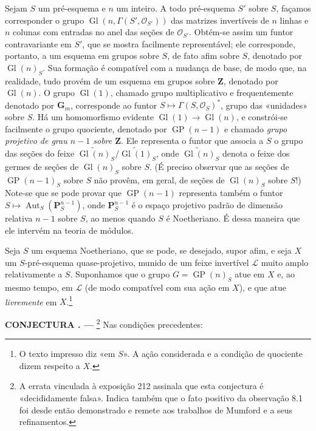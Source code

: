 \documentclass[11pt,twoside,openany]{book}
\numberwithin{equation}{section}
\newcommand{\src}[1]{%
  \phantomsection\hypertarget{src:#1}{}%
  \marginpar{\raggedleft\footnotesize\sffamily #1}%
}
\theoremstyle{plain}
\theoremstyle{definition}
\theoremstyle{remark}
\newcommand{\result}[2]{%
  \par\medskip\noindent\textbf{#1%
  \if\relax\detokenize{#2}\relax\else\space#2\fi. ---}\enspace
}
\newcommand{\FgaUnitKey}{frontmatter}
\renewcommand{\src}[1]{%
  \phantomsection\hypertarget{src:\FgaUnitKey:#1}{}%
  \marginpar{\raggedleft\footnotesize\sffamily #1}%
}
\begin{document}
Sejam $S$ um pré-esquema e $n$ um inteiro. A todo pré-esquema $S'$ sobre $S$,
façamos corresponder o grupo
$\operatorname{Gl}(n,\Gamma(S',\mathcal O_{S'}))$ das matrizes invertíveis de
$n$ linhas e $n$ colunas com entradas no anel das seções de
$\mathcal O_{S'}$. Obtém-se assim um funtor contravariante em $S'$, que se
mostra facilmente representável; ele corresponde, portanto, a um esquema em
grupos sobre $S$, de fato afim sobre $S$, denotado por $\operatorname{Gl}(n)_S$.
Sua formação é compatível com a mudança de base, de modo que, na realidade,
tudo provém de um esquema em grupos sobre $\mathbf Z$, denotado por
$\operatorname{Gl}(n)$. O grupo $\operatorname{Gl}(1)$, chamado grupo
multiplicativo e frequentemente denotado por $\mathbf G_m$, corresponde ao
funtor $S\longmapsto\Gamma(S,\mathcal O_S)^*$, grupo das «unidades» sobre $S$.
Há um homomorfismo evidente
$\operatorname{Gl}(1)\to\operatorname{Gl}(n)$, e constrói-se facilmente o
grupo quociente, denotado por $\operatorname{GP}(n-1)$ e chamado
\emph{grupo projetivo de grau $n-1$ sobre $\mathbf Z$}. Ele representa o
funtor que associa a $S$ o grupo das seções do feixe
$\widetilde{\operatorname{Gl}(n)}_S/
\widetilde{\operatorname{Gl}(1)}_S$, onde
$\widetilde{\operatorname{Gl}(n)}_S$ denota o feixe dos germes de seções de
$\operatorname{Gl}(n)_S$ sobre $S$. (É preciso observar que as seções de
$\operatorname{GP}(n-1)_S$ sobre $S$ não provêm, em geral, de seções de
$\operatorname{Gl}(n)_S$ sobre $S$!) Note-se que se pode provar que
$\operatorname{GP}(n-1)$ representa também o funtor
$S\longmapsto\operatorname{Aut}_S(\mathbf P_S^{n-1})$, onde
$\mathbf P_S^{n-1}$ é o espaço projetivo padrão de dimensão relativa $n-1$
sobre $S$, ao menos quando $S$ é Noetheriano. É dessa maneira que ele intervém
na teoria de módulos.

Seja $S$ um esquema Noetheriano, que se pode, se desejado, supor afim, e seja
$X$ um $S$-pré-esquema quase-projetivo, munido de um feixe invertível
$\mathcal L$ muito amplo relativamente a $S$. Suponhamos que o grupo
$G=\operatorname{GP}(n)_S$ atue em $X$ e, ao mesmo tempo, em $\mathcal L$ (de
modo compatível com sua ação em $X$), e que atue \emph{livremente} em
$X$.\footnote{O texto impresso diz «em $S$». A ação considerada e a condição
de quociente dizem respeito a $X$.}
\src{117}

\result{CONJECTURA}{8.1}\footnote{A errata vinculada à exposição 212 assinala
que esta conjectura é «decididamente falsa». Indica também que o fato positivo
da observação 8.1 foi desde então demonstrado e remete aos trabalhos de Mumford
e a seus refinamentos.} Nas condições precedentes:
\end{document}
